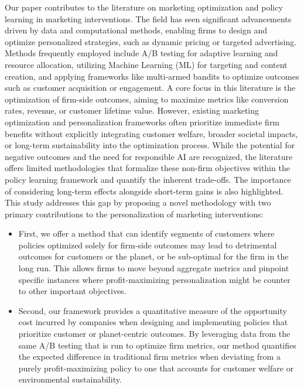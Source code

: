 \documentclass[11pt,letterpaper,english]{article}
\theoremstyle{definition}
\theoremstyle{definition}
\begin{document}
\begin{bibunit}
Our paper contributes to the literature on marketing optimization and policy learning in marketing interventions. The field has seen significant advancements driven by data and computational methods, enabling firms to design and optimize personalized strategies, such as dynamic pricing or targeted advertising. Methods frequently employed include A/B testing for adaptive learning and resource allocation, utilizing Machine Learning (ML) for targeting and content creation, and applying frameworks like multi-armed bandits to optimize outcomes such as customer acquisition or engagement. A core focus in this literature is the optimization of firm-side outcomes, aiming to maximize metrics like conversion rates, revenue, or customer lifetime value.
However, existing marketing optimization and personalization frameworks often prioritize immediate firm benefits without explicitly integrating customer welfare, broader societal impacts, or long-term sustainability into the optimization process. While the potential for negative outcomes and the need for responsible AI are recognized, the literature offers limited methodologies that formalize these non-firm objectives within the policy learning framework and quantify the inherent trade-offs. The importance of considering long-term effects alongside short-term gains is also highlighted.
This study addresses this gap by proposing a novel methodology with two primary contributions to the personalization of marketing interventions:
\begin{itemize}
    \item First, we offer a method that can identify segments of customers where policies optimized solely for firm-side outcomes may lead to detrimental outcomes for customers or the planet, or be sub-optimal for the firm in the long run. This allows firms to move beyond aggregate metrics and pinpoint specific instances where profit-maximizing personalization might be counter to other important objectives.

\item Second, our framework provides a quantitative measure of the opportunity cost incurred by companies when designing and implementing policies that prioritize customer or planet-centric outcomes. By leveraging data from the same A/B testing that is run to optimize firm metrics, our method quantifies the expected difference in traditional firm metrics when deviating from a purely profit-maximizing policy to one that accounts for customer welfare or environmental sustainability.
\end{itemize}


\end{bibunit}
\end{document}
